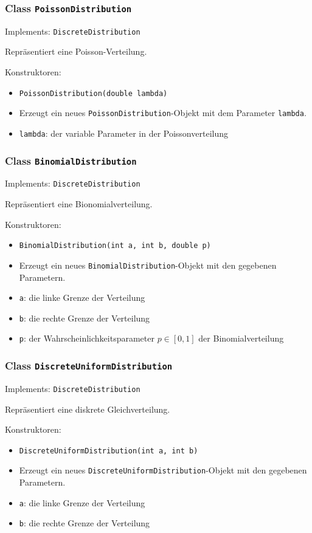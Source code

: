 \documentclass[parskip=full,11pt]{scrartcl}
\begin{document}
\subsubsection{Class \texttt{PoissonDistribution}}
Implements: \texttt{DiscreteDistribution}

Repräsentiert eine Poisson-Verteilung.

Konstruktoren:
\begin{itemize}\itemsep -10pt
\item \texttt{PoissonDistribution(double lambda)}
\item[] Erzeugt ein neues \texttt{PoissonDistribution}-Objekt mit dem Parameter \texttt{lambda}.
\item[] \texttt{lambda}: der variable Parameter in der Poissonverteilung
\end{itemize}

\subsubsection{Class \texttt{BinomialDistribution}}
Implements: \texttt{DiscreteDistribution}

Repräsentiert eine Bionomialverteilung.

Konstruktoren:
\begin{itemize}\itemsep -10pt
\item \texttt{BinomialDistribution(int a, int b, double p)}
\item[] Erzeugt ein neues \texttt{BinomialDistribution}-Objekt mit den gegebenen Parametern.
\item[] \texttt{a}: die linke Grenze der Verteilung
\item[] \texttt{b}: die rechte Grenze der Verteilung
\item[] \texttt{p}: der Wahrscheinlichkeitsparameter \(p \in [0,1]\) der Binomialverteilung
\end{itemize}

\subsubsection{Class \texttt{DiscreteUniformDistribution}}
Implements: \texttt{DiscreteDistribution}

Repräsentiert eine diskrete Gleichverteilung.

Konstruktoren:
\begin{itemize}\itemsep -10pt
\item \texttt{DiscreteUniformDistribution(int a, int b)}
\item[] Erzeugt ein neues \texttt{DiscreteUniformDistribution}-Objekt mit den gegebenen Parametern.
\item[] \texttt{a}: die linke Grenze der Verteilung
\item[] \texttt{b}: die rechte Grenze der Verteilung
\end{itemize}
\end{document}
